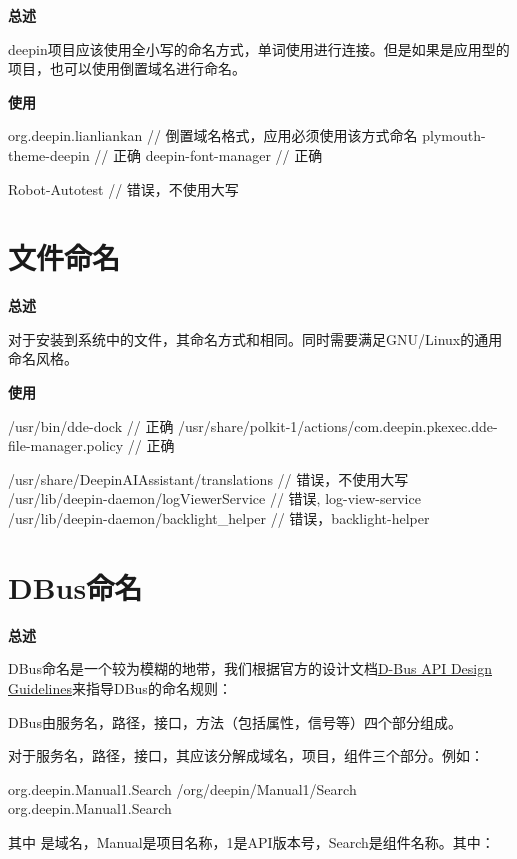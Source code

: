 \textbf{总述}

deepin项目应该使用全小写的命名方式，单词使用\cppinline{-}进行连接。但是如果是应用型的项目，也可以使用倒置域名进行命名。

\textbf{使用}

\begin{cppcode}
  org.deepin.lianliankan // 倒置域名格式，应用必须使用该方式命名
  plymouth-theme-deepin  // 正确
  deepin-font-manager    // 正确

  Robot-Autotest         // 错误，不使用大写
\end{cppcode}

\section{文件命名} \label{deepin-file-naming}

\textbf{总述}

对于安装到系统中的文件，其命名方式和相同。同时需要满足GNU/Linux的通用命名风格。

\textbf{使用}

\begin{cppcode}
  /usr/bin/dde-dock  // 正确
  /usr/share/polkit-1/actions/com.deepin.pkexec.dde-file-manager.policy  // 正确

  /usr/share/DeepinAIAssistant/translations  // 错误，不使用大写
  /usr/lib/deepin-daemon/logViewerService    // 错误, log-view-service
  /usr/lib/deepin-daemon/backlight_helper    // 错误，backlight-helper
\end{cppcode}

\section{DBus命名}

\textbf{总述}

DBus命名是一个较为模糊的地带，我们根据官方的设计文档\href{https://dbus.freedesktop.org/doc/dbus-api-design.html}{D-Bus API Design Guidelines}来指导DBus的命名规则：

DBus由服务名，路径，接口，方法（包括属性，信号等）四个部分组成。

对于服务名，路径，接口，其应该分解成域名，项目，组件三个部分。例如：

\begin{cppcode}
  org.deepin.Manual1.Search
  /org/deepin/Manual1/Search
  org.deepin.Manual1.Search
\end{cppcode}

其中  是域名，Manual是项目名称，1是API版本号，Search是组件名称。其中：


